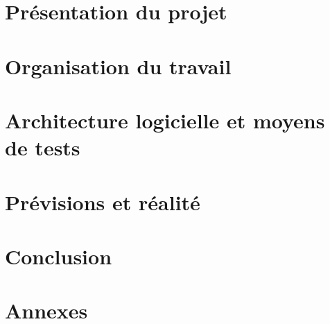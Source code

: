 \documentclass[a4paper,11pt]{article}
\begin{document}
\pagestyle{plain}


\selectfont

\makeTitlePage %

\clearpage
{}\selectfont

\begin{Large}
\tableofcontents
\end{Large}

\clearpage

\section{Présentation du projet}


\section{Organisation du travail}


\section{Architecture logicielle et moyens de tests}


\section{Prévisions et réalité}


\section{Conclusion}


\appendix
\clearpage
\section{Annexes}


\makeAbstractPage
\pagestyle{empty}
\end{document}
